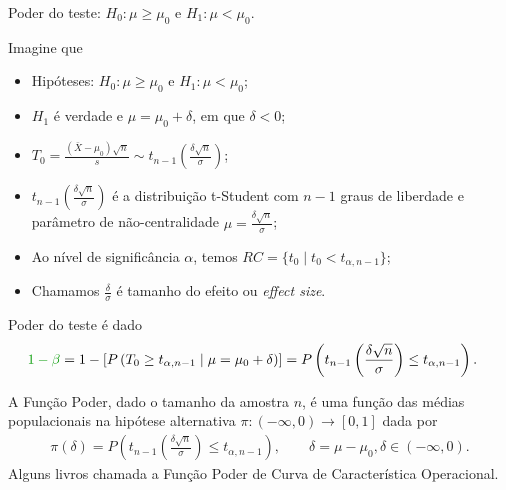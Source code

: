 \documentclass[8pt]{beamer}
\begin{document}
%
%

\begin{frame}{Poder do teste: $H_0:\mu \geq \mu_0$ e $H_1: \mu < \mu_0$.}

\small

Imagine que
\begin{itemize}
	\item Hipóteses: $H_0: \mu \geq \mu_0$ e $H_1: \mu < \mu_0$;
	\item $H_1$ é verdade e $\mu = \mu_0 + \delta$, em que $\delta < 0$;
	\item $T_0 = \frac{(\bar{X} - \mu_0)\sqrt{n}}{s}  \sim t_{n-1}\left( \frac{\delta \sqrt{n}}{\sigma} \right)$;
	\item $t_{n-1}\left(\frac{\delta\sqrt{n}}{\sigma}\right)$ é  a distribuição t-Student com $n-1$ graus de liberdade e parâmetro de não-centralidade $\mu = \frac{\delta \sqrt{n}}{\sigma}$;
	\item Ao nível de significância $\alpha$, temos $RC = \{ t_0 \mid t_0 < t_{\alpha, n-1}   \}$;
	\item Chamamos $\frac{\delta}{\sigma}$ é tamanho do efeito ou \textit{effect size}.
\end{itemize}
\vfill	

Poder do teste é dado
\begin{align*}
\textcolor{important}{1-\beta} &=1 - \left[P\left( T_0 \geq t_{\alpha, n-1} \mid \mu = \mu_0 + \delta \right)\right]  = P\left( t_{n-1}\left( \frac{\delta\sqrt{n}}{\sigma} \right) \leq t_{\alpha, n-1} \right).
\end{align*}
\vfill

A \textcolor{important}{Função Poder}, dado o tamanho da amostra $n$, é uma função das médias populacionais na hipótese alternativa  $\pi: (-\infty, 0) \longrightarrow [0,1]$ dada por
\begin{align*}
\pi(\delta) =  P\left( t_{n-1}\left( \frac{\delta\sqrt{n}}{\sigma} \right) \leq t_{\alpha, n-1}  \right),\qquad \delta = \mu - \mu_0, \delta \in (-\infty, 0).
\end{align*}
Alguns livros chamada a Função Poder de \textcolor{important}{Curva de Característica Operacional.}

\normalsize	

\end{frame}
\end{document}
